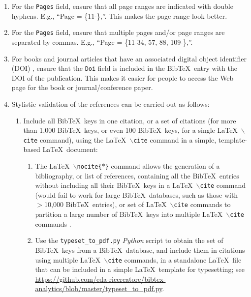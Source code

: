 \documentclass[letter,12pt]{article}
\begin{document}
\begin{enumerate}
\item For the {\tt Pages} field, ensure that all page ranges are indicated with double hyphens. E.g., ``Page = \{11-\},''. This makes the page range look better.
\item For the {\tt Pages} field, ensure that multiple pages and/or page ranges are separated by commas. E.g., ``Page = \{11-34, 57, 88, 109-\},''.
\item For books and journal articles that have an associated digital object identifier (DOI) \cite{InternationalDOIFoundationStaff2017}, ensure that the {\tt Doi} field is included in the {\sc Bib}\TeX\ entry with the DOI of the publication. This makes it easier for people to access the Web page for the book or journal/conference paper.
\item Stylistic validation of the references can be carried out as follows: \vspace{-0.3cm}
	\begin{enumerate} \itemsep -2pt
	\item Include all {\sc Bib}\TeX\ keys in one citation, or a set of citations (for more than 1,000 {\sc Bib}\TeX\ keys, or even 100 {\sc Bib}\TeX\ keys, for a single \LaTeX\ {\tt $\backslash$cite} command), using the \LaTeX\ {\tt $\backslash$cite} command in a simple, template-based \LaTeX\ document: \vspace{-0.2cm}
		\begin{enumerate} \itemsep -2pt
		\item The \LaTeX\ {\tt $\backslash$nocite\{$\ast$\}} command allows the generation of a bibliography, or list of references, containing all the {\sc Bib}\TeX\ entries without including all their {\sc Bib}\TeX\ keys in a \LaTeX\ {\tt $\backslash$cite} command (would fail to work for large {\sc Bib}\TeX\ databases, such as those with $>$10,000 {\sc Bib}\TeX\ entries), or set of \LaTeX\ {\tt $\backslash$cite} commands to partition a large number of {\sc Bib}\TeX\ keys into multiple \LaTeX\ {\tt $\backslash$cite} commands \cite[in \S2 Citations: \S2.4 No cite]{WikibooksContributors2021a}.
		\item Use the {\tt typeset\_to\_pdf.py} {\it Python} script \cite{Ong2023a} to obtain the set of {\sc Bib}\TeX\ keys from a {\sc Bib}\TeX\ database, and include them in citations using multiple \LaTeX\ {\tt $\backslash$cite} commands, in a standalone \LaTeX\ file that can be included in a simple \LaTeX\ template for typesetting; see \url{https://github.com/eda-ricercatore/bibtex-analytics/blob/master/typeset_to_pdf.py}.
		\end{enumerate}

\end{enumerate}
\end{enumerate}
\end{document}
